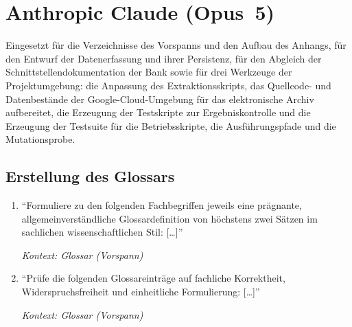 
\section{Anthropic Claude (Opus~5)}
\label{sec:prompts-claude}

\nocite{claudeOpus2026}

Eingesetzt für die Verzeichnisse des Vorspanns und den Aufbau des Anhangs,
für den Entwurf der Datenerfassung und ihrer Persistenz, für den Abgleich der
Schnittstellendokumentation der Bank sowie für drei Werkzeuge der
Projektumgebung: die Anpassung des Extraktionsskripts, das Quellcode- und
Datenbestände der Google-Cloud-Umgebung für das elektronische Archiv
aufbereitet, die Erzeugung der Testskripte zur Ergebniskontrolle und die
Erzeugung der Testsuite für die Betriebsskripte, die Ausführungspfade und die
Mutationsprobe.

\subsection{Erstellung des Glossars}
\label{sec:prompts-claude-glossar}
\begin{enumerate}
    \item \enquote{Formuliere zu den folgenden Fachbegriffen jeweils eine
            prägnante, allgemeinverständliche Glossardefinition von höchstens
            zwei Sätzen im sachlichen wissenschaftlichen Stil: [\dots]}
            \par\hfill\textit{Kontext: Glossar (Vorspann)}

    \item \enquote{Prüfe die folgenden Glossareinträge auf fachliche
            Korrektheit, Widerspruchsfreiheit und einheitliche Formulierung:
            [\dots]}
            \par\hfill\textit{Kontext: Glossar (Vorspann)}
\end{enumerate}


